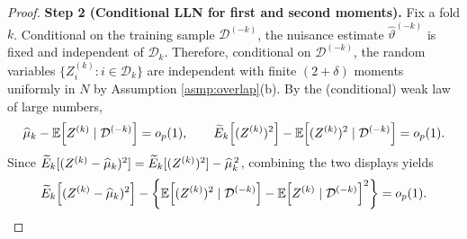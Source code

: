 \documentclass{article}
\begin{document}
\begin{proof}
\textbf{Step 2 (Conditional LLN for first and second moments).}
Fix a fold $k$. Conditional on the training sample $\mathcal{D}^{(-k)}$, the nuisance estimate $\widehat{\vartheta}^{(-k)}$ is fixed and independent of $\mathcal{D}_k$.
Therefore, conditional on $\mathcal{D}^{(-k)}$, the random variables $\{Z_i^{(k)}:i\in\mathcal{D}_k\}$ are independent with finite $(2+\delta)$ moments uniformly in $N$ by Assumption \ref{asmp:overlap}(b).
By the (conditional) weak law of large numbers,
\[
\widehat{\mu}_k - \operatorname{\mathbb{E}}\!\left[Z^{(k)}\mid \mathcal{D}^{(-k)}\right] = o_p(1),
\qquad
\widetilde{E}_k\!\left[(Z^{(k)})^2\right] - \operatorname{\mathbb{E}}\!\left[(Z^{(k)})^2\mid \mathcal{D}^{(-k)}\right] = o_p(1).
\]
Since $\widetilde{E}_k[(Z^{(k)}-\widehat{\mu}_k)^2]=\widetilde{E}_k[(Z^{(k)})^2]-\widehat{\mu}_k^{\,2}$, combining the two displays yields
\[
\widetilde{E}_k\!\left[(Z^{(k)}-\widehat{\mu}_k)^2\right]
-
\left\{
\operatorname{\mathbb{E}}\!\left[(Z^{(k)})^2\mid \mathcal{D}^{(-k)}\right]
-
\operatorname{\mathbb{E}}\!\left[Z^{(k)}\mid \mathcal{D}^{(-k)}\right]^2
\right\}
=o_p(1).
\]


\end{proof}
\end{document}
